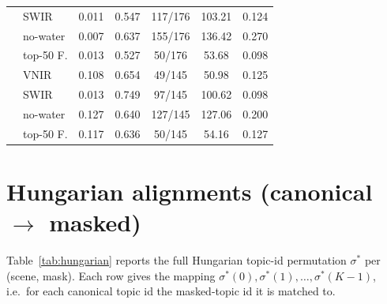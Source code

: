 \documentclass[11pt,a4paper]{article}
\begin{document}
\begin{table}[t]
\begin{tabular}{ll c c c c c}
  & SWIR        & 0.011 & 0.547 & 117/176 & 103.21 & 0.124 \\
  & no-water    & 0.007 & 0.637 & 155/176 & 136.42 & 0.270 \\
  & top-50 F.   & 0.013 & 0.527 & 50/176  & 53.68  & 0.098 \\
\addlinespace
\multirow{4}{*}{Botswana}
  & VNIR        & 0.108 & 0.654 & 49/145  & 50.98  & 0.125 \\
  & SWIR        & 0.013 & 0.749 & 97/145  & 100.62 & 0.098 \\
  & no-water    & 0.127 & 0.640 & 127/145 & 127.06 & 0.200 \\
  & top-50 F.   & 0.117 & 0.636 & 50/145  & 54.16  & 0.127 \\
\bottomrule
\end{tabular}
\end{table}

\section{Hungarian alignments (canonical $\to$ masked)}

Table~\ref{tab:hungarian} reports the full Hungarian topic-id
permutation $\sigma^*$ per (scene, mask). Each row gives the mapping
$\sigma^*(0), \sigma^*(1), \ldots, \sigma^*(K-1)$, i.e.\ for each
canonical topic id the masked-topic id it is matched to.
\end{document}
